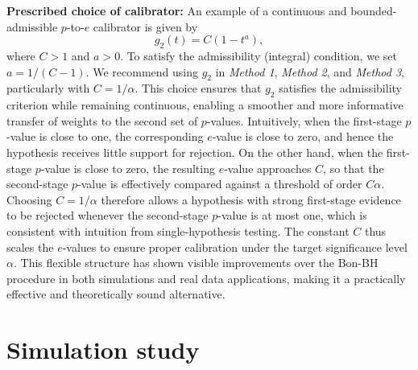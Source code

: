 \documentclass[11pt]{article}
\numberwithin{equation}{section}
\theoremstyle{plain}
\theoremstyle{remark}
\begin{document}
\textbf{Prescribed choice of calibrator:} An example of a continuous and bounded-admissible $p$-to-$e$ calibrator is given by
\[
g_2(t) = C(1 - t^a),
\]
where \(C > 1\) and \(a > 0\). To satisfy the admissibility (integral) condition, we set \(a = 1/(C - 1)\). We recommend using \(g_2\) in \textit{Method 1}, \textit{Method 2}, and \textit{Method 3}, particularly with
\(
C = 1/\alpha.
\)
This choice ensures that \(g_2\) satisfies the admissibility criterion while remaining continuous, enabling a smoother and more informative transfer of weights to the second set of $p$-values. Intuitively, when the first-stage $p$-value is close to one, the corresponding $e$-value is close to zero, and hence the hypothesis receives little support for rejection. On the other hand, when the first-stage $p$-value is close to zero, the resulting $e$-value approaches \(C\), so that the second-stage $p$-value is effectively compared against a threshold of order \(C\alpha\). Choosing \(C = 1/\alpha\) therefore allows a hypothesis with strong first-stage evidence to be rejected whenever the second-stage $p$-value is at most one, which is consistent with intuition from single-hypothesis testing. The constant \(C\) thus scales the $e$-values to ensure proper calibration under the target significance level \(\alpha\). This flexible structure has shown visible improvements over the Bon-BH procedure in both simulations and real data applications, making it a practically effective and theoretically sound alternative.



\section{Simulation study}
\end{document}
